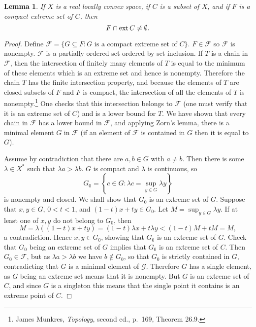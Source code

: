 \documentclass{article}
\newcommand{\ext}{\ensuremath\mathrm{ext}\,}
\newtheorem{lemma}[theorem]{Lemma}
\theoremstyle{definition}
\begin{document}
\begin{lemma}
If $X$ is a real locally convex space, if $C$ is a subset of $X$, and if $F$ is a compact extreme set of $C$, then
\[
F \cap \ext C \neq \emptyset.
\]
\label{compactextreme}
\end{lemma}
\begin{proof}
Define $\mathscr{F} = \{G \subseteq F: \textrm{$G$ is a compact extreme set of $C$}\}$. $F \in \mathscr{F}$ so $\mathscr{F}$ is nonempty. 
$\mathscr{F}$ is a partially ordered set ordered by set inclusion. If $T$ is a chain in $\mathscr{F}$, then the intersection of finitely many elements
of $T$ is equal to the minimum of these elements which is an extreme set and hence is nonempty. Therefore
the chain $T$ has the finite intersection property, and because the elements of $T$ are closed subsets of $F$ and $F$ is compact, the intersection
of all the elements of $T$ is nonempty.\footnote{James Munkres,
{\em Topology}, second ed., p.~169, Theorem 26.9.}
One checks that this intersection belongs to $\mathscr{F}$ (one must verify that it is an extreme set of $C$) and is a lower bound for $T$. We have shown that every chain in $\mathscr{F}$ has a lower bound in 
$\mathscr{F}$, and applying Zorn's lemma, there is a minimal element $G$ in $\mathscr{F}$ (if an element of $\mathscr{F}$ is contained in $G$ then it is equal to
$G$).

Assume by contradiction that there are $a,b \in G$ with $a \neq b$. Then there is some
$\lambda \in X^*$ such that $\lambda a > \lambda b$. $G$ is compact and $\lambda$ is continuous, so
\[
G_0=\left\{ c \in G: \lambda c = \sup_{y \in G} \lambda y \right\}
\]
 is nonempty and closed. We shall show that $G_0$ is an extreme set of $G$. Suppose that $x,y \in G$, $0<t<1$, and $(1-t)x+ty \in G_0$.
 Let $M = \sup_{y \in G} \lambda y$. If  at least one of $x ,y$ do not belong to $G_0$, then
 \[
 M=\lambda ((1-t)x+ty) = (1-t)\lambda x + t \lambda y < (1-t)M+tM=M,
 \]
 a contradiction. Hence $x,y \in G_0$, showing that $G_0$ is an extreme set of $G$. Check that $G_0$ being an extreme set of $G$ implies that $G_0$ is an extreme
 set of $C$. Then $G_0 \in \mathscr{F}$, but as $\lambda a>\lambda b$ we have $b \not \in G_0$, so that $G_0$ is strictly contained in $G$, contradicting that
 $G$ is a minimal element of $\mathscr{G}$.  Therefore $G$ has a single element, as $G$ being an extreme set means that it is nonempty.
 But $G$ is an extreme set of $C$, and since $G$ is a singleton this means that the single point it contains is an extreme point of $C$.
 \end{proof}
\end{document}

